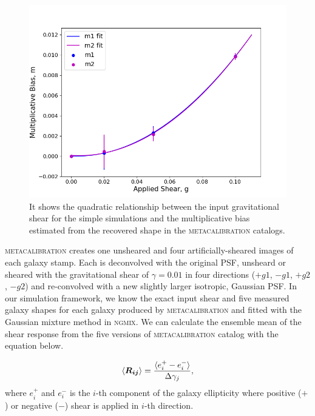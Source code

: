 \documentclass[fleqn,usenatbib]{mnras}
\begin{document}
\begin{figure}
	\includegraphics[width=\columnwidth]{metacal_bias_shear.png}
    \vspace*{-5mm}
    \caption{It shows the quadratic relationship between the input gravitational shear for the simple simulations and the multiplicative bias estimated from the recovered shape in the \textsc{metacalibration} catalogs. }
    \label{fig:metacal_shear_linear}
\end{figure}


\textsc{metacalibration} creates one unsheared and four artificially-sheared images of each galaxy stamp. Each is deconvolved with the original PSF, unsheard or sheared with the gravitational shear of $\gamma=0.01$ in four directions ($+g1$, $-g1$, $+g2$, $-g2$) and re-convolved with a new slightly larger isotropic, Gaussian PSF. In our simulation framework, we know the exact input shear and five measured galaxy shapes for each galaxy produced by \textsc{metacalibration} and fitted with the Gaussian mixture method in \textsc{ngmix}. We can calculate the ensemble mean of the shear response from the five versions of \textsc{metacalibration} catalog with the equation below. 


\begin{equation}
    \langle\vb*{R_{ij}}\rangle = 
    \frac{\langle e^{+}_{i} - e^{-}_{i} \rangle}{\Delta\gamma_{j}}, 
\end{equation}
where $e^{+}_{i}$ and $e^{-}_{i}$ is the $i$-th component of the galaxy ellipticity where positive ($+$) or negative ($-$) shear is applied in $i$-th direction. 
\end{document}
